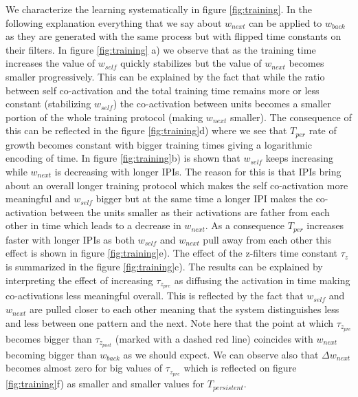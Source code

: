 \documentclass[10pt,a4paper]{article}
\begin{document}
We characterize the learning systematically in figure \ref{fig:training}.  In the following explanation everything that we say about $w_{next}$ can be applied to $w_{back}$ as they are generated with the same process but with flipped time constants on their filters. In figure \ref{fig:training} a) we observe that as the training time increases the value of $w_{self}$ quickly stabilizes but the value of $w_{next}$ becomes smaller progressively. This can be explained by the fact that while the ratio between self co-activation and the total training time remains more or less constant (stabilizing $w_{self}$) the co-activation between units becomes a smaller portion of the whole training protocol (making $w_{next}$ smaller). The consequence of this can be reflected in the figure \ref{fig:training}d) where we see that $T_{per}$ rate of growth becomes constant with bigger training times giving a logarithmic encoding of time. In figure \ref{fig:training}b) is shown that $w_{self}$ keeps increasing while $w_{next}$ is decreasing with longer IPIs. The reason for this is that IPIs bring about an overall longer training protocol which makes the self co-activation more meaningful and $w_{self}$ bigger but at the same time a longer IPI makes the co-activation between the units smaller as their activations are father from each other in time which leads to a decrease in $w_{next}$. As a consequence $T_{per}$ increases faster with longer IPIs as both $w_{self}$ and $w_{next}$ pull away from each other this effect is shown in figure \ref{fig:training}e). The effect of the z-filters time constant $\tau_z$ is summarized in the figure \ref{fig:training}c). The results can be explained by interpreting the effect of increasing $\tau_{z_{pre}}$ as diffusing the activation in time making co-activations less meaningful overall. This is reflected by the fact that $w_{self}$  and $w_{next}$ are pulled closer to each other meaning that the system distinguishes less and less between one pattern and the next. Note here that the point at which $\tau_{z_{pre}}$ becomes bigger than $\tau_{z_{post}}$ (marked with a dashed red line) coincides with $w_{next}$ becoming bigger than $w_{back}$ as we should expect. We can observe also that  $\Delta w_{next}$ becomes almost zero for big values of $\tau_{z_{pre}}$ which is reflected on figure \ref{fig:training}f) as smaller and smaller values for $T_{persistent}$. 
\end{document}
